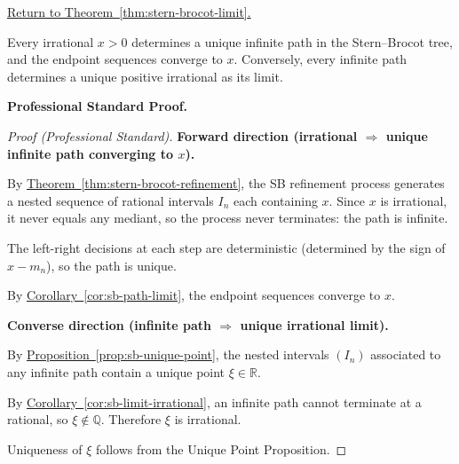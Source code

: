 
\newpage
{}
\label{prf:stern-brocot-limit}

\begin{remark*}[Return]
\hyperref[thm:stern-brocot-limit]{Return to Theorem~\ref*{thm:stern-brocot-limit}.}
\end{remark*}

\begin{theorem*}
Every irrational $x > 0$ determines a unique infinite path in the
Stern--Brocot tree, and the endpoint sequences converge to $x$.
Conversely, every infinite path determines a unique positive irrational
as its limit.
\end{theorem*}

\textbf{Professional Standard Proof.}~\\
\begin{proof}
[Proof (Professional Standard)]
\textbf{Forward direction (irrational $\Rightarrow$ unique infinite path
converging to $x$).}

By \hyperref[thm:stern-brocot-refinement]{Theorem~\ref*{thm:stern-brocot-refinement}},
the SB refinement process generates a nested sequence of rational intervals
$I_n$ each containing $x$.  Since $x$ is irrational, it never equals any
mediant, so the process never terminates: the path is infinite.

The left-right decisions at each step are deterministic (determined by the
sign of $x - m_n$), so the path is unique.

By \hyperref[cor:sb-path-limit]{Corollary~\ref*{cor:sb-path-limit}},
the endpoint sequences converge to $x$.

\textbf{Converse direction (infinite path $\Rightarrow$ unique irrational limit).}

By \hyperref[prop:sb-unique-point]{Proposition~\ref*{prop:sb-unique-point}},
the nested intervals $(I_n)$ associated to any infinite path contain a
unique point $\xi \in \mathbb{R}$.

By \hyperref[cor:sb-limit-irrational]{Corollary~\ref*{cor:sb-limit-irrational}},
an infinite path cannot terminate at a rational, so $\xi \notin \mathbb{Q}$.
Therefore $\xi$ is irrational.

Uniqueness of $\xi$ follows from the Unique Point Proposition.
\end{proof}

